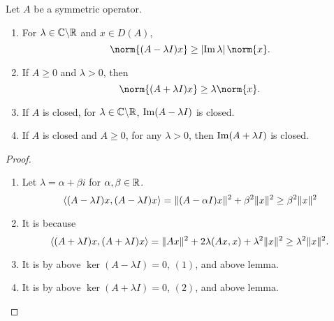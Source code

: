 \documentclass[a4paper,12pt]{article}
\begin{document}
\begin{prop}
    Let $A$ be a symmetric operator.
    \begin{enumerate}[label=(\arabic{*})]
        \item For $\lambda \in \mathbb{C} \backslash \mathbb{R}$ and $x \in D(A)$, 
        \begin{equation*}
            \norm{(A - \lambda I)x} \geq \abs{\Img \lambda} \norm{x}.
        \end{equation*}

        \item If $A \geq 0$ and $\lambda > 0$, then
        \begin{equation*}
            \norm{(A+\lambda I)x} \geq \lambda \norm{x}.
        \end{equation*}

        \item If $A$ is closed, for $\lambda \in \mathbb{C} \backslash \mathbb{R}$, $\operatorname{Im} (A - \lambda I)$ is closed.

        \item If $A$ is closed and $A \geq 0$, for any $\lambda > 0$, then $\operatorname{Im} (A + \lambda I)$ is closed.
    \end{enumerate}
\end{prop}
\begin{proof}
    \begin{enumerate}[label=(\arabic{*})]
        \item Let $\lambda = \alpha + \beta i$ for $\alpha,\beta \in \mathbb{R}$.
        \begin{equation*}
            \left\langle (A-\lambda I) x,(A-\lambda I) x \right\rangle=\|(A-\alpha I) x\|^2+\beta^2\|x\|^2 \geq \beta^2\|x\|^2
        \end{equation*}

        \item It is because
        \begin{equation*}
            \left\langle (A+\lambda I) x,(A+\lambda I) x \right\rangle=\|A x\|^2+2 \lambda(A x, x)+\lambda^2\|x\|^2 \geq \lambda^2\|x\|^2.
        \end{equation*}

        \item It is by above $\ker(A - \lambda I) = 0$, $(1)$, and above lemma.
        \item It is by above $\ker(A + \lambda I) = 0$, $(2)$, and above lemma.
    \end{enumerate}
\end{proof}
\end{document}
